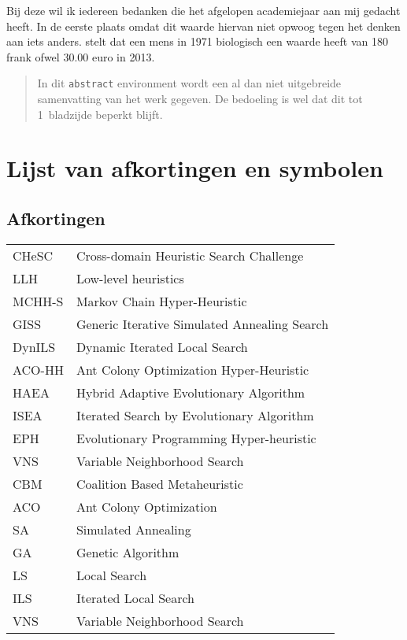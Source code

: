 \documentclass[master=elt,masteroption=ge]{kulemt}
\begin{document}
\begin{preface}
  Bij deze wil ik iedereen bedanken die het afgelopen academiejaar aan mij gedacht heeft. In de eerste plaats omdat dit waarde hiervan niet opwoog tegen het denken aan iets anders. \cite{gastonVanCamp} stelt dat een mens in 1971 biologisch een waarde heeft van 180 frank ofwel 30.00 euro in 2013.
\end{preface}

\tableofcontents*

\begin{abstract}
  In dit \texttt{abstract} environment wordt een al dan niet uitgebreide
  samenvatting van het werk gegeven. De bedoeling is wel dat dit tot
  1~bladzijde beperkt blijft.

  \lipsum[1]
\end{abstract}

\listoffiguresandtables
\chapter{Lijst van afkortingen en symbolen}
\section*{Afkortingen}
\begin{flushleft}
  \renewcommand{\arraystretch}{1.1}
  \begin{tabularx}{\textwidth}{@{}p{22mm}X@{}}%
    CHeSC	& Cross-domain Heuristic Search Challenge \\
    LLH		&Low-level heuristics \\
    MCHH-S	&Markov Chain Hyper-Heuristic\\
    GISS	&Generic Iterative Simulated Annealing Search\\
    DynILS	&Dynamic Iterated Local Search\\
    ACO-HH	&Ant Colony Optimization Hyper-Heuristic\\
    HAEA	&Hybrid Adaptive Evolutionary Algorithm\\
    ISEA	&Iterated Search by Evolutionary Algorithm\\
    EPH		&Evolutionary Programming Hyper-heuristic\\
    VNS		&Variable Neighborhood Search\\
    CBM		&Coalition Based Metaheuristic\\
    ACO		&Ant Colony Optimization\\
    SA		&Simulated Annealing\\
    GA		&Genetic Algorithm\\
    LS		&Local Search\\
    ILS		&Iterated Local Search\\
    VNS		&Variable Neighborhood Search\\
  \end{tabularx}
\end{flushleft}
\end{document}
